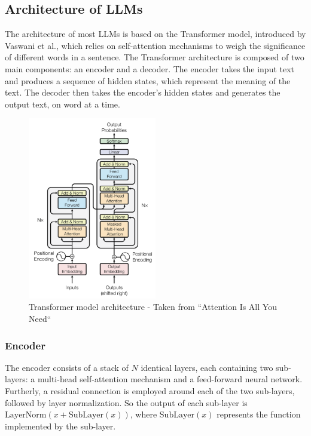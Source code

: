         \subsection{Architecture of LLMs}
        The architecture of most LLMs is based on the Transformer model, introduced by Vaswani et al., which relies on self-attention mechanisms to weigh the significance of different words in a sentence. The Transformer architecture is composed of two main components: an encoder and a decoder. The encoder takes the input text and produces a sequence of hidden states, which represent the meaning of the text. The decoder then takes the encoder's hidden states and generates the output text, on word at a time.
            \begin{figure}[h!]
                \centering
                \includegraphics[width=0.5\textwidth]{figs/transform_model.png}
                \caption{Transformer model architecture - Taken from “Attention Is All You Need“}
            \end{figure}
            \subsubsection{Encoder}
            The encoder consists of a stack of \(N\) identical layers, each containing two sub-layers: a multi-head self-attention mechanism and a feed-forward neural network. Furtherly, a residual connection is employed around each of the two sub-layers, followed by layer normalization. So the output of each sub-layer is \(\text{LayerNorm}(x + \text{SubLayer} (x))\), where \(\text{SubLayer}(x)\) represents the function implemented by the sub-layer.
            
